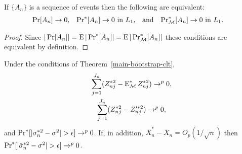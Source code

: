 \documentclass[11pt]{article}
\begin{document}
\begin{lem}\label{equivalent-convergence-from-lie-lemma}
  If $\{A_n\}$ is a sequence of events then the following are equivalent:
  \begin{align*}
  \operatorname{Pr}[A_n] &\to 0, &
  \operatorname{Pr}^*[A_n] &\to 0 \text{\ in\ }L_1, &
  &\text{and}&
  \operatorname{Pr}_{\mathcal{M}}^*[A_n] &\to 0 \text{\ in\ }L_1.
  \end{align*}
\end{lem}
\begin{proof}
  Since $|\operatorname{Pr}[A_n]| = \operatorname{E} |\operatorname{Pr}^*[A_n]| = \operatorname{E} |\operatorname{Pr}^*_{\mathcal{M}}[A_n]|$ these
  conditions are equivalent by definition.
\end{proof}

\begin{lem}\label{bootstrap-variance-convergence-lemma}
Under the conditions of Theorem~\ref{main-bootstrap-clt},
\begin{gather}
  \label{eq:25}
  \sum_{j=1}^{J_n} (Z_{nj}^{*2} - \operatorname{E}_{\mathcal{M}}^* Z_{nj}^{*2}) \to^p 0,
  \\
  \label{eq:26}
  \sum_{j=1}^{J_n} (Z_{nj}^{*2} - Z_{nj}^{\prime*2}) \to^p 0,
\end{gather}
and $\operatorname{Pr}^*[ |\sigma_n^{*2} - \sigma^2| > \epsilon] \to^p 0$.
If, in addition, $\bar X_n^* - \bar X_n = O_p(1/\sqrt{n})$ then
$\operatorname{Pr}^*[ |\hat\sigma_n^{*2} - \sigma^2| > \epsilon] \to^p 0$.
\end{lem}
\end{document}
